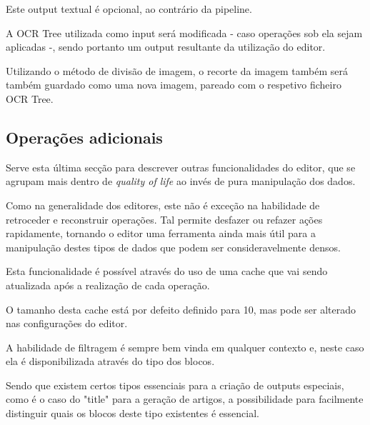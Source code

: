 
Este output textual é opcional, ao contrário da pipeline.

A OCR Tree utilizada como input será modificada - caso operações sob ela sejam aplicadas -, sendo portanto um output resultante da utilização do editor. 

Utilizando o método de divisão de imagem, o recorte da imagem também será também guardado como uma nova imagem, pareado com o respetivo ficheiro OCR Tree.



\subsection{Operações adicionais}

Serve esta última secção para descrever outras funcionalidades do editor, que se agrupam mais dentro de \textit{quality of life} ao invés de pura manipulação dos dados.


Como na generalidade dos editores, este não é exceção na habilidade de retroceder e reconstruir operações. Tal permite desfazer ou refazer ações rapidamente, tornando o editor uma ferramenta ainda mais útil para a manipulação destes tipos de dados que podem ser consideravelmente densos.


Esta funcionalidade é possível através do uso de uma cache que vai sendo atualizada após a realização de cada operação.

O tamanho desta cache está por defeito definido para 10, mas pode ser alterado nas configurações do editor.





A habilidade de filtragem é sempre bem vinda em qualquer contexto e, neste caso ela é disponibilizada através do tipo dos blocos.

Sendo que existem certos tipos essenciais para a criação de outputs especiais, como é o caso do "title" para a geração de artigos, a possibilidade para facilmente distinguir quais os blocos deste tipo existentes é essencial. 





